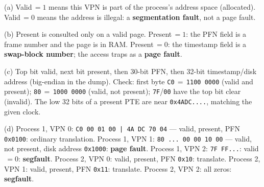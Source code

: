 \documentclass[11pt,a4paper]{article}
\newenvironment{Sol}{%
  \begin{tcolorbox}[sboxstyle, title={Solution}]%
}{%
  \end{tcolorbox}\vspace{0.35em}%
}
\begin{document}
\begin{Sol}
(a) Valid$\,=1$ means this VPN is part of the process's address space
(allocated). Valid$\,=0$ means the address is illegal: a
\textbf{segmentation fault}, not a page fault.

(b) Present is consulted only on a valid page. Present$\,=1$: the PFN field
is a frame number and the page is in RAM. Present$\,=0$: the timestamp
field is a \textbf{swap-block number}; the access traps as a
\textbf{page fault}.

(c) Top bit valid, next bit present, then 30-bit PFN, then 32-bit
timestamp/disk address (big-endian in the dump). Check: first byte
\texttt{C0}$\,=\,$\texttt{1100\,0000} (valid and present);
\texttt{80}$\,=\,$\texttt{1000\,0000} (valid, not present);
\texttt{7F}/\texttt{00} have the top bit clear (invalid). The low 32 bits
of a present PTE are near \texttt{0x4ADC....}, matching the given clock.

(d) Process 1, VPN 0: \texttt{C0 00 01 00 | 4A DC 70 04} --- valid, present,
PFN \texttt{0x0100}: ordinary translation.
Process 1, VPN 1: \texttt{80 ... 00 00 10 00} --- valid, not present, disk
address \texttt{0x1000}: \textbf{page fault}.
Process 1, VPN 2: \texttt{7F FF...}: valid$\,=0$: \textbf{segfault}.
Process 2, VPN 0: valid, present, PFN \texttt{0x10}: translate.
Process 2, VPN 1: valid, present, PFN \texttt{0x11}: translate.
Process 2, VPN 2: all zeros: \textbf{segfault}.
\end{Sol}
\end{document}
